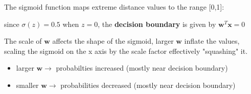 \documentclass{article}
\renewcommand\vec{\mathbf}
\begin{document}
{    The sigmoid function maps extreme distance values to the range [0,1]:
       

    since $\sigma(z) = 0.5$ when $z = 0$, the \textbf{decision boundary} is given by $\vec{w}^{T}\vec{x} = 0$

    The scale of $\vec{w}$ affects the shape of the sigmoid, larger $\vec{w}$ inflate the values, scaling the sigmoid on the x axis by the scale factor effectively "squashing" it.
    \begin{itemize}
        \item larger $\vec{w} \rightarrow$ probabilties increased (mostly near decision boundary)
        \item smaller $\vec{w} \rightarrow$ probabilities decreased (mostly near decision boundary)
    \end{itemize}
    \begin{center}
    \end{center}
}
\end{document}
